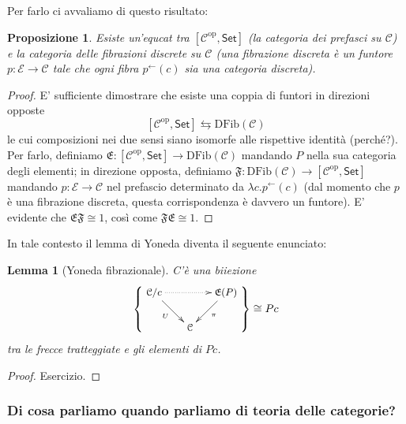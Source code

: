 \documentclass[11pt]{article}
\def\C{\mathcal{C}}
\def\Set{\mathsf{Set}}
\def\opp{\mathrm{op}}
\theoremstyle{reference}
\newtheorem{lemma}[theorem]{Lemma}
\newtheorem{proposition}[theorem]{Proposizione}
\begin{document}
Per farlo ci avvaliamo di questo risultato:
\begin{proposition}
Esiste un’equcat tra $[\C^\opp,\Set]$ (la categoria dei
prefasci su $\C$) e la categoria delle \emph{fibrazioni discrete}
su $\C$ (una fibrazione discreta è un funtore $p : \mathcal
E \to \C$ tale che ogni fibra $p^\leftarrow(c)$ sia una
categoria discreta). 
\end{proposition}
\begin{proof}
E' sufficiente dimostrare che esiste una coppia di funtori
in direzioni opposte 
$$ [\C^\opp,\Set] \leftrightarrows
\text{DFib}(\C) $$ 
le cui composizioni nei due sensi siano
isomorfe alle rispettive identità (perché?). Per farlo,
definiamo ${\mathfrak E} : [\C^\opp,\Set] \to
\text{DFib}(\C)$ mandando $P$ nella sua categoria degli
elementi; in direzione opposta, definiamo ${\mathfrak F} :
\text{DFib}(\C) \to [\C^\opp,\Set]$ mandando $p : \mathcal
E\to \C$ nel prefascio determinato da $\lambda
c.p^\leftarrow(c)$ (dal momento che $p$ è una fibrazione
discreta, questa corrispondenza è davvero un funtore). E'
evidente che $\mathfrak{EF}\cong 1$, così come
$\mathfrak{FE}\cong 1$.
\end{proof}
In tale contesto il lemma di Yoneda diventa il seguente enunciato:
\begin{lemma}[Yoneda fibrazionale]
C'è una biiezione
$$\left\{
{\small 
\vcenter{
  \xymatrix@!=3mm{
  \C/c \ar@{.>}[rr]\ar[dr]_U && \mathfrak E(P)\ar[dl]^\pi \\
  & \C & 
  }
}}
\right\} \cong Pc$$
tra le frecce tratteggiate e gli elementi di $Pc$.
\end{lemma}
\begin{proof}
Esercizio.
\end{proof}

\subsubsection{Di cosa parliamo quando parliamo di teoria delle categorie?}
\label{sec:org0c00629}
\end{document}
